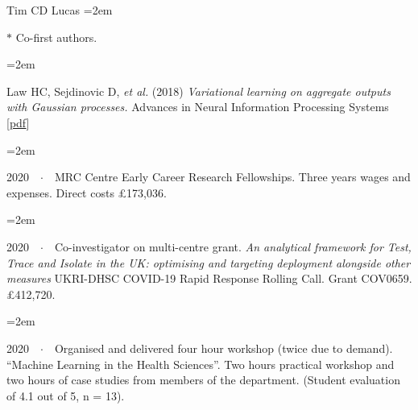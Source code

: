 \documentclass{scrartcl}
\newcommand{\MarginText}[1]{\marginpar{\raggedleft\itshape\small#1}} %
\newcommand{\Description}[1]{\hangindent=2em\hangafter=0\noindent\raggedright\footnotesize{#1}\par\normalsize\vspace{1em}} %
\begin{document}
\begin{cv}{Tim {\Large CD} Lucas}
\Description{\MarginText{} \scriptsize{ $\ast$ Co-first authors. } }



{\color{Maroon}}\vspace{1em}


\Description{\MarginText{2018}Law HC, Sejdinovic D, \emph{et al.} (2018) \emph{Variational learning on aggregate outputs with Gaussian processes.} Advances in Neural Information Processing Systems [\href{http://papers.nips.cc/paper/7847-variational-learning-on-aggregate-outputs-with-gaussian-processes.pdf}{pdf}]}


\vspace{1em} %





{\color{Maroon}}\vspace{1em}

\Description{2020\ \ $\cdotp$\ \ MRC Centre Early Career Research Fellowships. \emph{} Three years wages and expenses. Direct costs £173,036.}
\vspace{-0.5em} %
\Description{2020\ \ $\cdotp$\ \ Co-investigator on multi-centre grant. \emph{An analytical framework for Test, Trace and Isolate in the UK: optimising and targeting deployment alongside other measures} UKRI-DHSC COVID-19 Rapid Response Rolling Call. Grant COV0659. £412,720.}
\vspace{-0.5em} %

\vspace{1em} %








{\color{Maroon}}\vspace{1em}


\Description{2020\ \ $\cdotp$\ \ Organised and delivered four hour workshop (twice due to demand).  ``Machine Learning in the Health Sciences''. Two hours practical workshop and two hours of case studies from members of the department. (Student evaluation of 4.1 out of 5, n = 13).}
\vspace{-0.5em} %


\end{cv}
\end{document}
